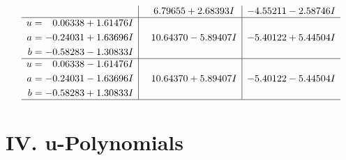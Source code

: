 \documentclass[1p]{elsarticle_modified}
\theoremstyle{definition}
\begin{document}
$$\begin{array}{c|c|c}
 & \phantom{-}6.79655 + 2.68393 I & -4.55211 - 2.58746 I \\ \hline\begin{aligned}
u &= \phantom{-}0.06338 + 1.61476 I \\
a &= -0.24031 + 1.63696 I \\
b &= -0.58283 - 1.30833 I\end{aligned}
 & \phantom{-}10.64370 - 5.89407 I & -5.40122 + 5.44504 I \\ \hline\begin{aligned}
u &= \phantom{-}0.06338 - 1.61476 I \\
a &= -0.24031 - 1.63696 I \\
b &= -0.58283 + 1.30833 I\end{aligned}
 & \phantom{-}10.64370 + 5.89407 I & -5.40122 - 5.44504 I\\
 \hline 
 \end{array}$$\newpage
\newpage\renewcommand{\arraystretch}{1}
\centering \section*{ IV. u-Polynomials}
\end{document}
